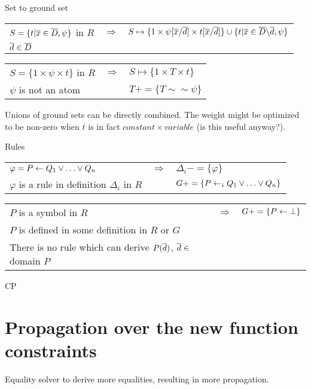 \documentclass{article}
\newcommand{\DDD}{\ensuremath{\overline{D}}}
\begin{document}
\noindent Set to ground set

\begin{tabular}{|lcl|} \hline
$S=\{t | \xxx \in \DDD, \psi\}$ in $R$ & $\Longrightarrow$ & $S \mapsto \{1\times \psi[\xxx\subs\ddd] \times t[\xxx\subs\ddd]\}\cup\{t | \xxx \in \DDD\elim\ddd, \psi\}$ \\
$\ddd \in \DDD$ &&\\
\hline
\end{tabular}

\begin{tabular}{|lcl|} \hline
$S=\{1\times \psi \times t\}$ in $R$ & $\Longrightarrow$ & $S \mapsto \{1\times T \times t\}$ \\
$\psi$ is not an atom & & $T += \{ T \sim\sim \psi\}$ \\
\hline
\end{tabular}

Unions of ground sets can be directly combined.
The weight might be optimized to be non-zero when $t$ is in fact $constant \times variable$ (is this useful anyway?).

\noindent Rules

\begin{tabular}{|lcl|} \hline
$\varphi = P \leftarrow Q_1 \lor \ldots \lor Q_n$ & $\Longrightarrow$ & $\Delta_i-=\{\varphi\}$ \\
$\varphi$ is a rule in definition $\Delta_i$ in $R$ && $G+=\{P \leftarrow_i Q_1 \lor \ldots \lor Q_n\}$\\
\hline
\end{tabular}

\begin{tabular}{|lcl|} \hline
$P$ is a symbol in $R$ & $\Longrightarrow$ & $G+=\{P \leftarrow \bot\}$ \\
$P$ is defined in some definition in $R$ or $G$ &&\\
There is no rule which can derive $P(\overline{d})$, $\overline{d} \in$ domain $P$ &&\\
\hline
\end{tabular}


\noindent CP

\section{Propagation over the new function constraints}
Equality solver to derive more equalities, resulting in more propagation.
\end{document}
